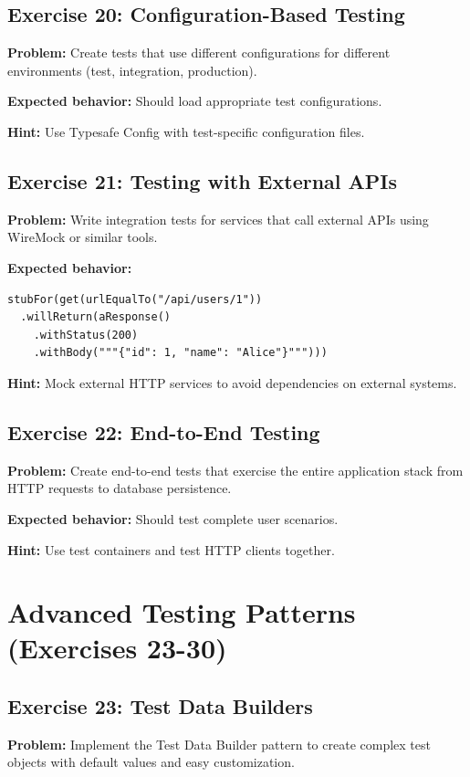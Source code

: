 \documentclass[12pt,a4paper]{article}
\begin{document}
\subsection{Exercise 20: Configuration-Based Testing}
\textbf{Problem:} Create tests that use different configurations for different environments (test, integration, production).

\textbf{Expected behavior:} Should load appropriate test configurations.

\textbf{Hint:} Use Typesafe Config with test-specific configuration files.

\subsection{Exercise 21: Testing with External APIs}
\textbf{Problem:} Write integration tests for services that call external APIs using WireMock or similar tools.

\textbf{Expected behavior:}
\begin{lstlisting}
stubFor(get(urlEqualTo("/api/users/1"))
  .willReturn(aResponse()
    .withStatus(200)
    .withBody("""{"id": 1, "name": "Alice"}""")))
\end{lstlisting}

\textbf{Hint:} Mock external HTTP services to avoid dependencies on external systems.

\subsection{Exercise 22: End-to-End Testing}
\textbf{Problem:} Create end-to-end tests that exercise the entire application stack from HTTP requests to database persistence.

\textbf{Expected behavior:} Should test complete user scenarios.

\textbf{Hint:} Use test containers and test HTTP clients together.

\section{Advanced Testing Patterns (Exercises 23-30)}

\subsection{Exercise 23: Test Data Builders}
\textbf{Problem:} Implement the Test Data Builder pattern to create complex test objects with default values and easy customization.
\end{document}
